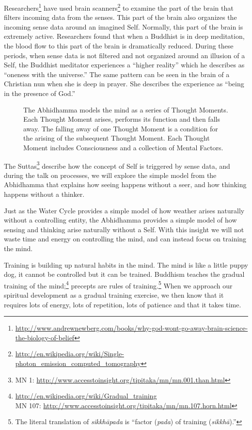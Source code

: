 Researchers\footnote{\url{http://www.andrewnewberg.com/books/why-god-wont-go-away-brain-science-the-biology-of-belief}} have used brain scanners\footnote{\url{http://en.wikipedia.org/wiki/Single-photon_emission_computed_tomography}} to examine the part of the brain that filters incoming data from the senses. This part of the brain also organizes the incoming sense data around an imagined Self. Normally, this part of the brain is extremely active. Researchers found that when a Buddhist is in deep meditation, the blood flow to this part of the brain is dramatically reduced. During these periods, when sense data is not filtered and not organized around an illusion of a Self, the Buddhist meditator experiences a “higher reality” which he describes as “oneness with the universe.” The same pattern can be seen in the brain of a Christian nun when she is deep in prayer. She describes the experience as “being in the presence of God.”

\begin{figure}[H]
\centering

\caption{The Abhidhamma models the mind as a series of Thought Moments. Each Thought Moment arises, performs its function and then falls away. The falling away of one Thought Moment is a condition for the arising of the subsequent Thought Moment. Each Thought Moment includes Consciousness and a collection of Mental Factors.}
\label{fig:Model}
\end{figure}

The Suttas\footnote{MN 1: \url{http://www.accesstoinsight.org/tipitaka/mn/mn.001.than.html}} describe how the concept of Self is triggered by sense data, and during the talk on processes, we will explore the simple model from the Abhidhamma that explains how seeing happens without a seer, and how thinking happens without a thinker.

Just as the Water Cycle provides a simple model of how weather arises naturally without a controlling entity, the Abhidhamma provides a simple model of how sensing and thinking arise naturally without a Self. With this insight we will not waste time and energy on controlling the mind, and can instead focus on training the mind.

Training is building up natural habits in the mind. The mind is like a little puppy dog, it cannot be controlled but it can be trained. Buddhism teaches the gradual training of the mind;\footnote{\url{http://en.wikipedia.org/wiki/Gradual_training}\\MN 107: \url{http://www.accesstoinsight.org/tipitaka/mn/mn.107.horn.html}} precepts are rules of training.\footnote{The literal translation of \textit{sikkhāpada} is “factor (\textit{pada}) of training (\textit{sikkhā}).”} When we approach our spiritual development as a gradual training exercise, we then know that it requires lots of energy, lots of repetition, lots of patience and that it takes time. 

